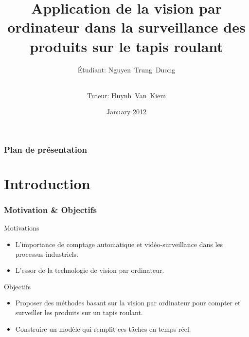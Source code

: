 \documentclass{beamer}
\title[Projet de fin d'étude]{Application de la vision par ordinateur dans la surveillance des produits sur le tapis roulant} %
\author[Nguyen~Trung~Duong]{Étudiant: Nguyen~Trung~Duong \and \\
Tuteur: Huynh~Van~Kiem} %
\institute[IPHCMV] %
{Génie Électrique - Électronique \\
Institut Poytechnique de Ho Chi Minh Ville \\ %
}
\date[January 2012]{January 2012} %
\begin{document}
\begin{frame}
\titlepage %
\end{frame}

\begin{frame}
\frametitle{Plan de présentation} %
\tableofcontents %
\end{frame}


\section{Introduction} %


\begin{frame}
\frametitle{Motivation \& Objectifs}
\begin{exampleblock}{\Large{Motivations}}
\begin{itemize}
	\item L'importance de comptage automatique et vidéo-surveillance dans les processus industriels.
	\item L'essor de la technologie de vision par ordinateur.
\end{itemize}
\end{exampleblock}

\medskip
\begin{exampleblock}{\Large{Objectifs}}
\begin{itemize}
\item Proposer des méthodes basant sur la vision par ordinateur pour compter et surveiller les produits sur un tapis roulant.  
\item Construire un modèle qui remplit ces tâches en temps réel.
\end{itemize}
\end{exampleblock}
\end{frame}
\end{document}
